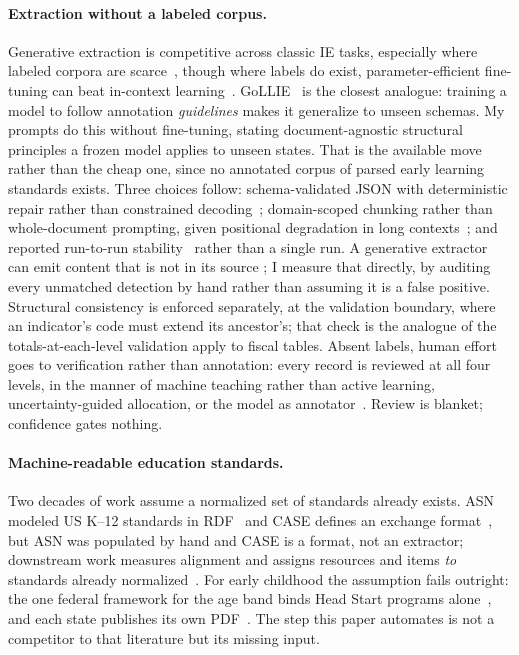 \paragraph{Extraction without a labeled corpus.} Generative extraction is
competitive across classic IE tasks, especially where labeled corpora are
scarce~\citep{wadhwa2023revisiting,xu2024large,agrawal2022large}, though where
labels do exist, parameter-efficient fine-tuning can beat in-context
learning~\citep{liu2022fewshot}. GoLLIE~\citep{sainz2024gollie} is the closest
analogue: training a model to follow annotation \emph{guidelines} makes it
generalize to unseen schemas. My prompts do this without fine-tuning, stating
document-agnostic structural principles a frozen model applies to unseen
states. That is the available move rather than the cheap one, since no
annotated corpus of parsed early learning standards exists. Three choices
follow: schema-validated JSON with deterministic repair rather than constrained
decoding~\citep{willard2023efficient}; domain-scoped chunking rather than
whole-document prompting, given positional degradation in long
contexts~\citep{liu2024lost}; and reported run-to-run
stability~\citep{wang2023selfconsistency} rather than a single run.
A generative extractor can emit content that is not in its source
\citep{ji2023survey}; I measure that directly, by auditing every unmatched
detection by hand rather than assuming it is a false positive. Structural
consistency is enforced separately, at the validation boundary, where an
indicator's code must extend its ancestor's; that check is the analogue of
the totals-at-each-level validation \citet{aggarwal2025fiscal} apply to
fiscal tables.
Absent labels, human effort goes to verification rather than annotation: every
record is reviewed at all four levels, in the manner of machine teaching rather
than active learning, uncertainty-guided allocation, or the model as
annotator~\citep{mosqueirarey2023human,monarch2021human,settles2009active,li2023coannotating,gilardi2023chatgpt,tan2024large}.
Review is blanket; confidence gates nothing.

\paragraph{Machine-readable education standards.} Two decades of work assume a
normalized set of standards already exists. ASN modeled US K--12 standards in
RDF~\citep{sutton2008achievement} and CASE defines an exchange
format~\citep{1edtech2017case}, but ASN was populated by hand and CASE
is a format, not an extractor; downstream work measures alignment and assigns
resources and items \emph{to} standards already
normalized~\citep{porter2002measuring,polikoff2011howwell,devaul2011computer,xu2025automated}.
For early childhood the assumption fails outright: the one federal framework
for the age band binds Head Start programs alone~\citep{ohs2015elof}, and each
state publishes its own PDF~\citep{ncecqa_elgs,ecs2024governance}. The step
this paper automates is not a competitor to that literature but its missing
input.
